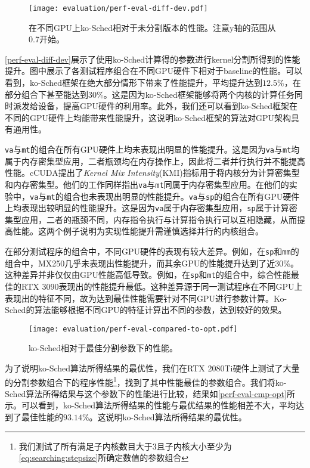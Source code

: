 \begin{figure}[htbp]
    \centering
    \texttt{[image: evaluation/perf-eval-diff-dev.pdf]}
    \caption{在不同GPU上ko-Sched相对于未分割版本的性能。注意y轴的范围从0.7开始。}
    \label{perf-eval-diff-dev}
\end{figure}

\autoref{perf-eval-diff-dev}展示了使用ko-Sched计算得的参数进行kernel分割所得到的性能提升。图中展示了各测试程序组合在不同GPU硬件下相对于baseline的性能。可以看到，ko-Sched框架在绝大部分情形下带来了性能提升，平均提升达到$12.5\%$，在部分组合下甚至能达到$30\%$。这是因为ko-Sched框架能够将两个内核的计算任务同时派发给设备，提高GPU硬件的利用率。此外，我们还可以看到ko-Sched框架在不同的GPU硬件上均能带来性能提升，这说明ko-Sched框架的算法对GPU架构具有通用性。

\texttt{va}与\texttt{mt}的组合在所有GPU硬件上均未表现出明显的性能提升。这是因为\texttt{va}与\texttt{mt}均属于内存密集型应用，二者瓶颈均在内存操作上，因此将二者并行执行并不能提高性能。cCUDA\cite{8853389}提出了\emph{Kernel Mix Intensity}(KMI)指标用于将内核分为计算密集型和内存密集型。他们的工作同样指出\texttt{va}与\texttt{mt}同属于内存密集型应用。在他们的实验中，\texttt{va}与\texttt{mt}的组合也未表现出明显的性能提升。\texttt{va}与\texttt{sp}的组合在所有GPU硬件上均表现出较明显的性能提升。这是因为\texttt{va}属于内存密集型应用，\texttt{sp}属于计算密集型应用，二者的瓶颈不同，内存指令执行与计算指令执行可以互相隐藏，从而提高性能。这两个例子说明为实现性能提升需谨慎选择并行的内核组合。

在部分测试程序的组合中，不同GPU硬件的表现有较大差异。例如，在\texttt{sp}和\texttt{mm}的组合中，MX250几乎未表现出性能提升，而其余GPU的性能提升达到了近30\%。这种差异并非仅仅由GPU性能高低导致。例如，在\texttt{sp}和\texttt{mt}的组合中，综合性能最佳的RTX 3090表现出的性能提升最低。这种差异源于同一测试程序在不同GPU上表现出的特征不同，故为达到最佳性能需要针对不同GPU进行参数计算。Ko-Sched的算法能够根据不同GPU的特征计算出不同的参数，达到较好的效果。

\begin{figure}[htbp]
    \centering
    \texttt{[image: evaluation/perf-eval-compared-to-opt.pdf]}
    \caption{ko-Sched相对于最佳分割参数下的性能。}
    \label{perf-eval-cmp-opt}
\end{figure}

为了说明ko-Sched算法所得结果的最优性，我们在RTX 2080Ti硬件上测试了大量的分割参数组合下的程序性能\footnote{我们测试了所有满足子内核数目大于3且子内核大小至少为\autoref{eq:searching:stepsize}所确定数值的参数组合}，找到了其中性能最佳的参数组合。我们将ko-Sched算法所得结果与这个参数下的性能进行比较，结果如\autoref{perf-eval-cmp-opt}所示。可以看到，ko-Sched算法所得结果的性能与最优结果的性能相差不大，平均达到了最佳性能的$93.14\%$。这说明ko-Sched算法所得结果的最优性。

